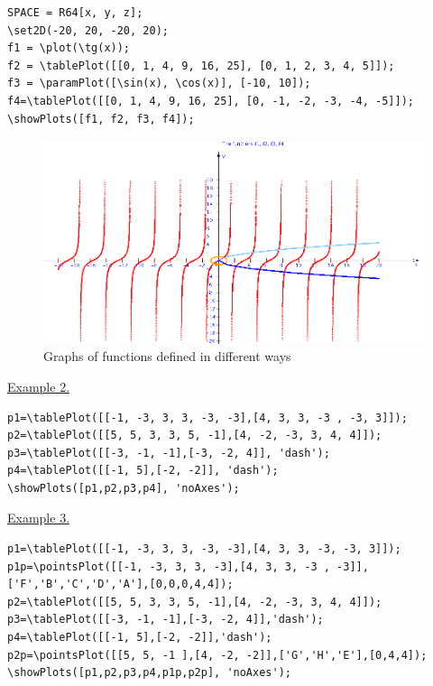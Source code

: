 \begin{verbatim}
SPACE = R64[x, y, z];
\set2D(-20, 20, -20, 20);
f1 = \plot(\tg(x));
f2 = \tablePlot([[0, 1, 4, 9, 16, 25], [0, 1, 2, 3, 4, 5]]);
f3 = \paramPlot([\sin(x), \cos(x)], [-10, 10]);
f4=\tablePlot([[0, 1, 4, 9, 16, 25], [0, -1, -2, -3, -4, -5]]);
\showPlots([f1, f2, f3, f4]);
\end{verbatim}
\begin{figure}[!ht]
 \includegraphics[scale=0.6]{pictures/3_6}
\caption{Graphs of functions defined in different ways}
\label{3_6}
\end{figure}

\underline{Example 2.}
 
 \vspace*{-2mm}

 \begin{verbatim}
p1=\tablePlot([[-1, -3, 3, 3, -3, -3],[4, 3, 3, -3 , -3, 3]]);
p2=\tablePlot([[5, 5, 3, 3, 5, -1],[4, -2, -3, 3, 4, 4]]);
p3=\tablePlot([[-3, -1, -1],[-3, -2, 4]], 'dash');
p4=\tablePlot([[-1, 5],[-2, -2]], 'dash');
\showPlots([p1,p2,p3,p4], 'noAxes');
 \end{verbatim}

\underline{Example 3.}
 
 \vspace*{-2mm}

 \begin{verbatim}
p1=\tablePlot([[-1, -3, 3, 3, -3, -3],[4, 3, 3, -3, -3, 3]]);
p1p=\pointsPlot([[-1, -3, 3, 3, -3],[4, 3, 3, -3 , -3]],['F','B','C','D','A'],[0,0,0,4,4]);
p2=\tablePlot([[5, 5, 3, 3, 5, -1],[4, -2, -3, 3, 4, 4]]);
p3=\tablePlot([[-3, -1, -1],[-3, -2, 4]],'dash');
p4=\tablePlot([[-1, 5],[-2, -2]],'dash');
p2p=\pointsPlot([[5, 5, -1 ],[4, -2, -2]],['G','H','E'],[0,4,4]);
\showPlots([p1,p2,p3,p4,p1p,p2p], 'noAxes');
 \end{verbatim}

